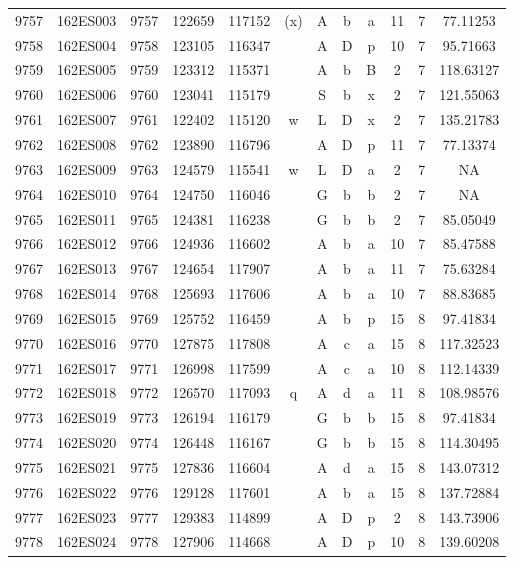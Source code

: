 \begin{tabular}{|*{12}{c|}}
9757 & 162ES003 & 9757 & 122659 & 117152 & (x) & A & b & a & 11 & 7 & 77.11253 \\ 
9758 & 162ES004 & 9758 & 123105 & 116347 &  & A & D & p & 10 & 7 & 95.71663 \\ 
9759 & 162ES005 & 9759 & 123312 & 115371 &  & A & b & B & 2 & 7 & 118.63127 \\ 
9760 & 162ES006 & 9760 & 123041 & 115179 &  & S & b & x & 2 & 7 & 121.55063 \\ 
9761 & 162ES007 & 9761 & 122402 & 115120 & w & L & D & x & 2 & 7 & 135.21783 \\ 
9762 & 162ES008 & 9762 & 123890 & 116796 &  & A & D & p & 11 & 7 & 77.13374 \\ 
9763 & 162ES009 & 9763 & 124579 & 115541 & w & L & D & a & 2 & 7 & NA \\ 
9764 & 162ES010 & 9764 & 124750 & 116046 &  & G & b & b & 2 & 7 & NA \\ 
9765 & 162ES011 & 9765 & 124381 & 116238 &  & G & b & b & 2 & 7 & 85.05049 \\ 
9766 & 162ES012 & 9766 & 124936 & 116602 &  & A & b & a & 10 & 7 & 85.47588 \\ 
9767 & 162ES013 & 9767 & 124654 & 117907 &  & A & b & a & 11 & 7 & 75.63284 \\ 
9768 & 162ES014 & 9768 & 125693 & 117606 &  & A & b & a & 10 & 7 & 88.83685 \\ 
9769 & 162ES015 & 9769 & 125752 & 116459 &  & A & b & p & 15 & 8 & 97.41834 \\ 
9770 & 162ES016 & 9770 & 127875 & 117808 &  & A & c & a & 15 & 8 & 117.32523 \\ 
9771 & 162ES017 & 9771 & 126998 & 117599 &  & A & c & a & 10 & 8 & 112.14339 \\ 
9772 & 162ES018 & 9772 & 126570 & 117093 & q & A & d & a & 11 & 8 & 108.98576 \\ 
9773 & 162ES019 & 9773 & 126194 & 116179 &  & G & b & b & 15 & 8 & 97.41834 \\ 
9774 & 162ES020 & 9774 & 126448 & 116167 &  & G & b & b & 15 & 8 & 114.30495 \\ 
9775 & 162ES021 & 9775 & 127836 & 116604 &  & A & d & a & 15 & 8 & 143.07312 \\ 
9776 & 162ES022 & 9776 & 129128 & 117601 &  & A & b & a & 15 & 8 & 137.72884 \\ 
9777 & 162ES023 & 9777 & 129383 & 114899 &  & A & D & p & 2 & 8 & 143.73906 \\ 
9778 & 162ES024 & 9778 & 127906 & 114668 &  & A & D & p & 10 & 8 & 139.60208 \\ 

\end{tabular}
